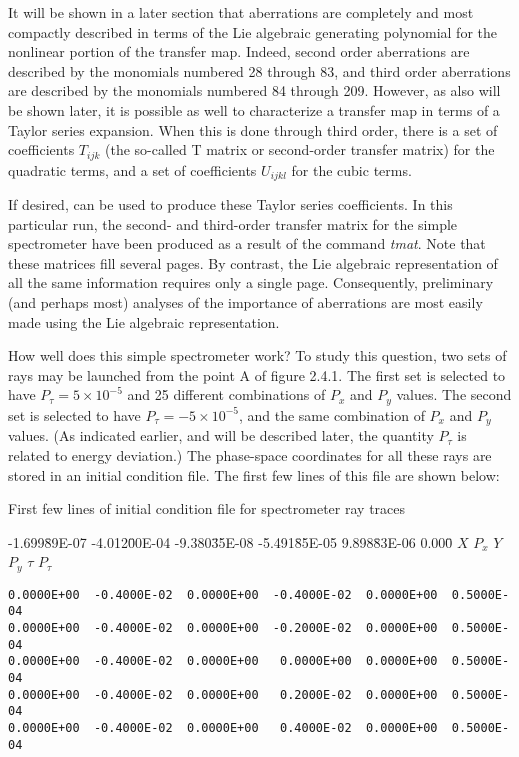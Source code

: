      It will be shown in a later section that aberrations are completely
and most compactly described in terms of the Lie algebraic generating
polynomial for the nonlinear portion of the transfer map.  Indeed, second
order aberrations are described by the monomials numbered 28 through 83,
and third order aberrations are described by the monomials numbered 84
through 209.  However, as also will be shown later, it is possible as well
to characterize a transfer map in terms of a Taylor series expansion.  When
this is done through third order, there is a set of coefficients $T_{ijk}$    (the
so-called T matrix or second-order transfer matrix) for the quadratic
terms, and a set of coefficients $U_{ijkl}$     for the cubic terms.

     If desired, \Mary can be used to produce these Taylor series coefficients.
In this particular \Mary run, the second- and third-order
transfer matrix for the simple spectrometer have been produced as a result
of the command {\em tmat}. Note that these matrices fill several pages.  By
contrast, the Lie algebraic representation of all the same information
requires only a single page.  Consequently, preliminary (and perhaps most)
analyses of the importance of aberrations are most easily made using the
Lie algebraic representation.

     How well does this simple spectrometer work?  To study this question,
two sets of rays may be launched from the point A of figure 2.4.1.  The
first set is selected to have $P_{\tau}= 5\times 10^{-5}$ and 25 different combinations
of $P_x$ and $P_y$  values.  The second set is selected to have
$P_{\tau}=-5\times 10^{-5}$,
and the same combination of $P_x$  and $P_y$  values.  (As indicated earlier, and
will be described later, the quantity $P_{\tau}$  is related to energy deviation.)
The phase-space coordinates for all these rays are stored in an initial
condition file.  The first few lines of this file are shown below:
\vspace{5mm}

First few lines of  initial condition file for spectrometer ray traces
\begin{footnotesize}
\begin{tt}
\begin{tabbing}
-1.699\=89E-07 -4.012\=00E-04 -9.380\=35E-08 -5.491\=85E-05 9.898\=83E-06 0.000\= \kill
\>$X$ \>$P_x$ \>$Y$ \>$P_y$ \>$\tau$ \>$P_{\tau}$
\end{tabbing}
\end{tt}
\vspace{-5mm}
\begin{verbatim}
0.0000E+00  -0.4000E-02  0.0000E+00  -0.4000E-02  0.0000E+00  0.5000E-04
0.0000E+00  -0.4000E-02  0.0000E+00  -0.2000E-02  0.0000E+00  0.5000E-04
0.0000E+00  -0.4000E-02  0.0000E+00   0.0000E+00  0.0000E+00  0.5000E-04
0.0000E+00  -0.4000E-02  0.0000E+00   0.2000E-02  0.0000E+00  0.5000E-04
0.0000E+00  -0.4000E-02  0.0000E+00   0.4000E-02  0.0000E+00  0.5000E-04
\end{verbatim}
\end{footnotesize}


